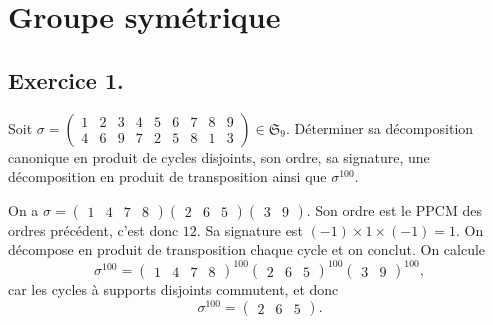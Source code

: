 \documentclass[./main]{subfiles}
\begin{document}
  \chapter{Groupe symétrique}
  \minitoc

  \section{Exercice 1.}
  \begin{enonce}
    Soit $\sigma = \begin{pmatrix} 1 & 2 & 3 & 4 & 5 & 6 & 7 & 8 & 9\\ 4 & 6 & 9 & 7 & 2 & 5 & 8 & 1 & 3 \end{pmatrix} \in \mathfrak{S}_9$.
    Déterminer sa décomposition canonique en produit de cycles disjoints, son ordre, sa signature, une décomposition en produit de transposition ainsi que $\sigma^{100}$.
  \end{enonce}
  On a $\sigma = \begin{pmatrix} 1 & 4 & 7 & 8 \end{pmatrix} \begin{pmatrix} 2 & 6 & 5 \end{pmatrix}\begin{pmatrix} 3 & 9 \end{pmatrix}$.
  Son ordre est le PPCM des ordres précédent, c'est donc $12$.
  Sa signature est $(-1) \times 1 \times (-1) = 1$.
  On décompose en produit de transposition chaque cycle et on conclut.
  On calcule \[
  \sigma^{100} = \begin{pmatrix} 1 & 4 & 7 & 8 \end{pmatrix}^{100} \begin{pmatrix} 2 & 6 & 5 \end{pmatrix}^{100}\begin{pmatrix} 3 & 9 \end{pmatrix}^{100}
  ,\] car les cycles à supports disjoints commutent, et donc \[
  \sigma^{100} = \begin{pmatrix} 2 & 6 & 5 \end{pmatrix} 
  .\] 
\end{document}
